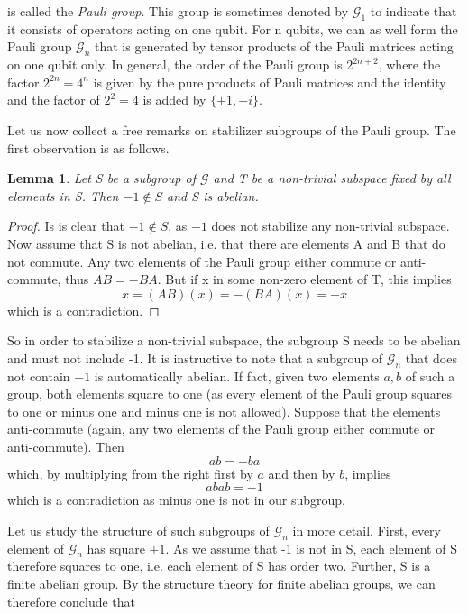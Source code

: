 \documentclass[a4paper, draft]{article}
\theoremstyle{own}
\newtheorem{lem}[thm]{Lemma}
\theoremstyle{remark}
\begin{document}
is called the \emph{Pauli group}. This group is sometimes denoted by $\mathcal{G}_1$ to indicate that it consists of operators acting on one qubit. For n qubits, we can as well form the Pauli group $\mathcal{G}_n$ that is generated by tensor products of the Pauli matrices acting on one qubit only. In general, the order of the Pauli group is $2^{2n+2}$, where the factor $2^{2n} = 4^n$ is given by the pure products of Pauli matrices and the identity and the factor of $2^2 =4$ is added by $\{\pm 1, \pm i\}$. 

Let us now collect a free remarks on stabilizer subgroups of the Pauli group. The first observation is as follows.

\begin{lem}
Let S be a subgroup of $\mathcal{G}$ and T be a non-trivial subspace fixed by all elements in S. Then $-1 \notin S$ and S is abelian.
\end{lem}

\begin{proof}
Is is clear that $-1 \notin S$, as $-1$ does not stabilize any non-trivial subspace. Now assume that S is not abelian, i.e. that there are elements A and B that do not commute. Any two elements of the Pauli group either commute or anti-commute, thus $AB = - BA$. But if x in some non-zero element of T, this implies
$$
x = (AB)(x) = - (BA)(x) = - x
$$
which is a contradiction.
\end{proof}
	
	
So in order to stabilize a non-trivial subspace, the subgroup S needs to be abelian and must not include -1. It is instructive to note that a subgroup of $\mathcal{G}_n$ that does not contain $-1$ is automatically abelian. If fact, given two elements $a, b$ of such a group, both elements square to one (as every element of the Pauli group squares to one or minus one and minus one is not allowed). Suppose that the elements anti-commute (again, any two elements of the Pauli group either commute or anti-commute). Then
$$
ab = -ba
$$
which, by multiplying from the right first by $a$ and then by $b$, implies
$$
abab = -1
$$
which is a contradiction as minus one is not in our subgroup.

Let us study the structure of such subgroups of $\mathcal{G}_n$ in more detail. First, every element of $\mathcal{G}_n$ has square $\pm 1$. As we assume that -1 is not in S, each element of S therefore squares to one, i.e. each element of S has order two. Further, S is a finite abelian group. By the structure theory for finite abelian groups, we can therefore conclude that 
\end{document}
